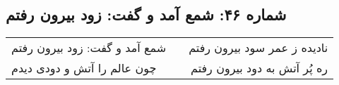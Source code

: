 \begin{center}
\section*{شماره ۴۶: شمع آمد و گفت: زود بیرون رفتم}
\label{sec:046}
\begin{longtable}{l p{0.5cm} r}
شمع آمد و گفت: زود بیرون رفتم
&&
نادیده ز عمر سود بیرون رفتم
\\
چون عالم را آتش و دودی دیدم
&&
ره پُر آتش به دود بیرون رفتم
\\
\end{longtable}
\end{center}
